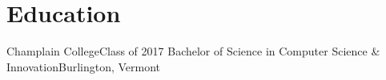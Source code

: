 \section{Education}
    \resumeSubHeadingListStart

    \resumeSubheading
    {Champlain College}{Class of 2017}
    {Bachelor of Science in Computer Science \& Innovation}{Burlington, Vermont}
    \resumeSubHeadingListEnd
